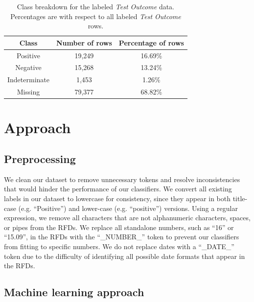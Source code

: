 \documentclass[sigconf]{acmart}
\begin{document}
\begin{table}
    \caption{Class breakdown for the labeled \textit{Test Outcome} data. Percentages are with respect to all labeled \textit{Test Outcome} rows.}
    \label{tab:to_labeled}
    
    \begin{tabular}{ccc}
        \toprule
        Class & Number of rows & Percentage of rows \\
        \midrule
        Positive & 19,249 & 16.69\% \\
        Negative & 15,268 & 13.24\% \\
        Indeterminate & 1,453 & 1.26\% \\
        Missing & 79,377 & 68.82\% \\
        \bottomrule
    \end{tabular}
\end{table}

\section{Approach}

\subsection{Preprocessing}

We clean our dataset to remove unnecessary tokens and resolve inconsistencies that would hinder the performance of our classifiers. We convert all existing labels in our dataset to lowercase for consistency, since they appear in both title-case (e.g. ``Positive'') and lower-case (e.g. ``positive'') versions. Using a regular expression, we remove all characters that are not alphanumeric characters, spaces, or pipes from the RFDs. We replace all standalone numbers, such as ``16'' or ``15.09'', in the RFDs with the ``\_NUMBER\_'' token to prevent our classifiers from fitting to specific numbers. We do not replace dates with a ``\_DATE\_'' token due to the difficulty of identifying all possible date formats that appear in the RFDs.

\subsection{Machine learning approach}
\end{document}
